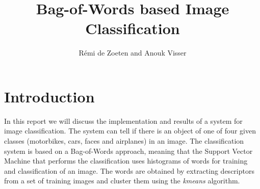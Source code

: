 \documentclass[11pt]{article}
\title{Bag-of-Words based Image Classification}
\author{R\'emi de Zoeten and Anouk Visser}
\begin{document}
\maketitle
\section{Introduction}
In this report we will discuss the implementation and results of a system for image classification. The system can tell if there is an object of one of four given classes (motorbikes, cars, faces and airplanes) in an image. The classification system is based on a Bag-of-Words approach, meaning that the Support Vector Machine that performs the classification uses histograms of words for training and classification of an image. The words are obtained by extracting descriptors from a set of training images and cluster them using the \textit{kmeans} algorithm.  
\end{document}
